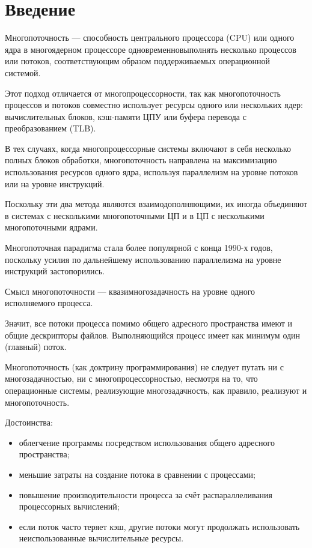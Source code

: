 \documentclass[12pt]{report}
\begin{document}
    
    \tableofcontents

    \newpage
    \chapter*{Введение}

    Многопоточность — способность центрального процессора (CPU) или одного ядра
    в многоядерном процессоре одновременновыполнять несколько процессов или
    потоков, соответствующим образом поддерживаемых операционной системой.

    Этот подход отличается от многопроцессорности, так как многопоточность
    процессов и потоков совместно использует ресурсы одного или нескольких ядер:
    вычислительных блоков, кэш-памяти ЦПУ или буфера перевода с преобразованием (TLB).

    В тех случаях, когда многопроцессорные системы включают в себя несколько полных блоков обработки,
    многопоточность направлена на максимизацию использования ресурсов одного ядра,
    используя параллелизм на уровне потоков или на уровне инструкций.

    Поскольку эти два метода являются взаимодополняющими,
    их иногда объединяют в системах с несколькими многопоточными ЦП
    и в ЦП с несколькими многопоточными ядрами.

    Многопоточная парадигма стала более популярной с конца 1990-х годов,
    поскольку усилия по дальнейшему использованию параллелизма на уровне инструкций застопорились.

    Смысл многопоточности — квазимногозадачность на уровне одного исполняемого процесса.

    Значит, все потоки процесса помимо общего адресного пространства имеют и общие дескрипторы файлов.
    Выполняющийся процесс имеет как минимум один (главный) поток.

    Многопоточность (как доктрину программирования) не следует путать ни с многозадачностью,
    ни с многопроцессорностью, несмотря на то, что операционные системы,
    реализующие многозадачность, как правило, реализуют и многопоточность.

    Достоинства:

    \begin{itemize}
        \item облегчение программы посредством использования общего адресного пространства;
        \item меньшие затраты на создание потока в сравнении с процессами;
        \item повышение производительности процесса за счёт распараллеливания процессорных вычислений;
        \item если поток часто теряет кэш, другие потоки могут продолжать
        использовать неиспользованные вычислительные ресурсы.
    \end{itemize}
\end{document}
